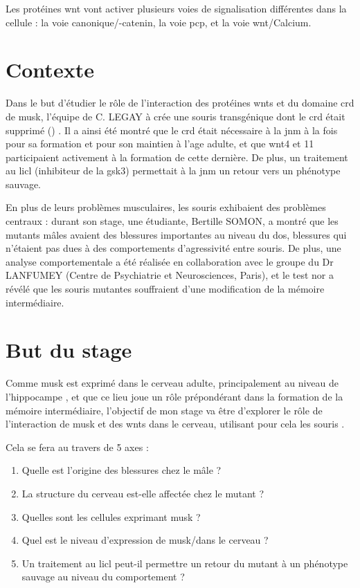 	Les protéines \gls{wnt} vont activer plusieurs voies de signalisation différentes dans la cellule :  la voie canonique/\textbeta{}-catenin, la voie \gls{pcp}, et la voie \gls{wnt}/Calcium. 

\section{Contexte}
	\label{sec:Contexte}
	
	Dans le but d'étudier le rôle de l'interaction des protéines \Glspl{wnt} et du domaine \gls{crd} de \gls{musk}, l'équipe de C. LEGAY à crée une souris transgénique dont le \gls{crd} était supprimé (\mcrd) \cite{Messeant2015, Messeant2017}. Il a ainsi été montré que le \gls{crd} était nécessaire à la \gls{jnm} à la fois pour sa formation et pour son maintien à l'age adulte, et que \Gls{wnt}4 et 11 participaient activement à la formation de cette dernière. De plus, un traitement au \gls{licl} (inhibiteur de la \gls{gsk3}) permettait à la \gls{jnm} un retour vers un phénotype sauvage.
	
	En plus de leurs problèmes musculaires, les souris \mcrd exhibaient des problèmes centraux : durant son stage, une étudiante, Bertille SOMON, a montré que les mutants mâles avaient des blessures importantes au niveau du dos, blessures qui n'étaient pas dues à des comportements d'agressivité entre souris. De plus, une analyse comportementale a été réalisée en collaboration avec le groupe du Dr LANFUMEY (Centre de Psychiatrie et Neurosciences, Paris), et le test \gls{nor} a révélé que les souris mutantes souffraient d'une modification de la mémoire intermédiaire.
		
\section{But du stage}
\label{sec:IntroBut}

Comme \gls{musk} est exprimé dans le cerveau adulte, principalement au niveau de l'hippocampe \cite{Garcia-Osta2006}, et que ce lieu joue un rôle prépondérant dans la formation de la mémoire intermédiaire, l'objectif de mon stage va être d'explorer le rôle de l'interaction de \gls{musk} et des \Glspl{wnt} dans le cerveau, utilisant pour cela les souris \mcrd.

Cela se fera au travers de 5 axes : 
\begin{enumerate}
	\item Quelle est l'origine des blessures chez le mâle ?
	\item La structure du cerveau est-elle affectée chez le mutant ?
	\item Quelles sont les cellules exprimant \gls{musk} ?
	\item Quel est le niveau d'expression de \gls{musk}/\mcrd dans le cerveau ?
	\item Un traitement au \gls{licl} peut-il permettre un retour du mutant à un phénotype sauvage au niveau du comportement ?
\end{enumerate}